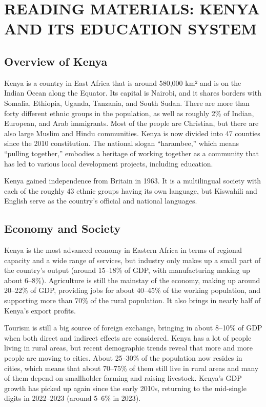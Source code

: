 \documentclass[12pt,a4paper]{article}
\begin{document}
\section*{READING MATERIALS: KENYA AND ITS EDUCATION SYSTEM}

\subsection*{Overview of Kenya}
Kenya is a country in East Africa that is around 580,000 km² and is on the Indian Ocean along the Equator. Its capital is Nairobi, and it shares borders with Somalia, Ethiopia, Uganda, Tanzania, and South Sudan. There are more than forty different ethnic groups in the population, as well as roughly 2\% of Indian, European, and Arab immigrants. Most of the people are Christian, but there are also large Muslim and Hindu communities. Kenya is now divided into 47 counties since the 2010 constitution. The national slogan ``harambee,'' which means ``pulling together,'' embodies a heritage of working together as a community that has led to various local development projects, including education.

Kenya gained independence from Britain in 1963. It is a multilingual society with each of the roughly 43 ethnic groups having its own language, but Kiswahili and English serve as the country’s official and national languages.

\subsection*{Economy and Society}
Kenya is the most advanced economy in Eastern Africa in terms of regional capacity and a wide range of services, but industry only makes up a small part of the country's output (around 15--18\% of GDP, with manufacturing making up about 6--8\%). Agriculture is still the mainstay of the economy, making up around 20--22\% of GDP, providing jobs for about 40--45\% of the working population, and supporting more than 70\% of the rural population. It also brings in nearly half of Kenya's export profits.

Tourism is still a big source of foreign exchange, bringing in about 8--10\% of GDP when both direct and indirect effects are considered. Kenya has a lot of people living in rural areas, but recent demographic trends reveal that more and more people are moving to cities. About 25--30\% of the population now resides in cities, which means that about 70--75\% of them still live in rural areas and many of them depend on smallholder farming and raising livestock. Kenya's GDP growth has picked up again since the early 2010s, returning to the mid-single digits in 2022--2023 (around 5--6\% in 2023).
\end{document}
